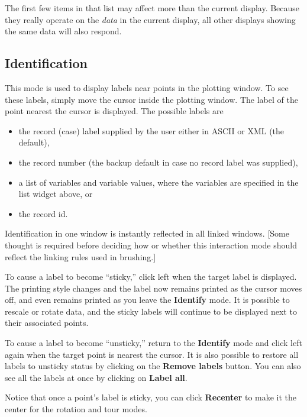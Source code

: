 \documentclass[11pt]{article}
\def\Widget#1{\textbf{#1}}
\begin{document}
The first few items in that list may affect more than the current
display.  Because they really operate on the {\em data} in the current
display, all other displays showing the same data will also respond.

\subsection{Identification}
\label{slbl:Identify}

This mode is used to display labels near points in the plotting window.
To see these labels, simply move the cursor inside the plotting window.
The label of the point nearest the cursor is displayed.  The possible
labels are

\begin{itemize} \itemsep 0em
\item the record (case) label supplied by the user either in ASCII
      or XML (the default),
\item the record number (the backup default in case no record label was
      supplied),
\item a list of variables and variable values, where the variables are
      specified in the list widget above, or
\item the record id.
\end{itemize}

Identification in one window is instantly reflected in all linked
windows.  [Some thought is required before deciding how or whether
this interaction mode should reflect the linking rules used in
brushing.]

To cause a label to become ``sticky,'' click left when the target
label is displayed.  The printing style changes and the label now
remains printed as the cursor moves off, and even remains printed as
you leave the \Widget{Identify} mode.  It is possible to rescale or
rotate data, and the sticky labels will continue to be displayed next
to their associated points.

To cause a label to become ``unsticky,'' return to the \Widget{Identify}
mode and click left again when the target point is nearest the
cursor.  It is also possible to restore all labels to unsticky status
by clicking on the \Widget{Remove labels} button.  You can also see all
the labels at once by clicking on \Widget{Label all}.

Notice that once a point's label is sticky, you can click
\Widget{Recenter} to make it the center for the rotation and tour
modes.
\end{document}
